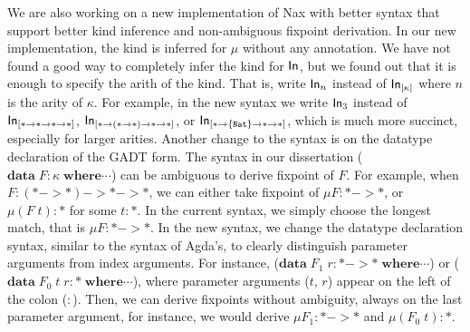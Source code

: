 We are also working on a new implementation of Nax with better syntax
that support better kind inference and non-ambiguous fixpoint derivation.
In our new implementation, the kind is inferred for $\mu$ without
any annotation. We have not found a good way to completely infer the kind
for $\mathsf{In}$, but we found out that it is enough to specify the arith of the kind.
That is, write $\mathsf{In}_n$ instead of $\mathsf{In}_{[\kappa]}$ where $n$ is the arity of
$\kappa$. For example, in the new syntax we write $\mathsf{In}_3$ instead of
$\mathsf{In}_{[* -> * -> * -> *]}$, $\mathsf{In}_{[* -> (* -> *) -> * -> *]}$, or
$\mathsf{In}_{[* -> \{\texttt{Nat}\} -> * -> *]}$, which is much more succinct,
especially for larger arities. Another change to the syntax is on
the datatype declaration of the GADT form. The syntax in our dissertation
($\mathbf{data}\;F : \kappa\;\mathbf{where} \cdots$) can be ambiguous
to derive fixpoint of $F$. For example, when $F : (* -> *) -> * -> *$,
we can either take fixpoint of $\mu F : * -> *$, or $\mu (F\;t) : *$
for some $t : *$. In the current syntax, we simply choose the longest match,
that is $\mu F : * -> *$. In the new syntax, we change the datatype declaration
syntax, similar to the syntax of Agda's, to clearly distinguish parameter
arguments from index arguments. For instance,
($\mathbf{data}\;F_1\;r: * -> * \;\mathbf{where} \cdots$) or
($\mathbf{data}\;F_0\;t\;r: * \;\mathbf{where} \cdots$), where
parameter arguments ($t$, $r$) appear on the left of the colon ($:$).
Then, we can derive fixpoints without ambiguity, always on the last
parameter argument, for instance, we would derive $\mu F_1 : * -> *$
and $\mu(F_0\;t): *$.


